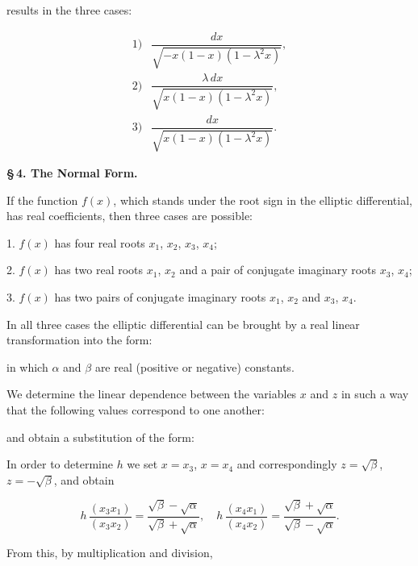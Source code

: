 
results in the three cases:

\[
\begin{array}{ll}
1) & \dfrac{dx}{\sqrt{-x(1-x)(1-\lambda^2x)}}, \\[10pt]
2) & \dfrac{\lambda\,dx}{\sqrt{x(1-x)(1-\lambda^2x)}}, \\[10pt]
3) & \dfrac{dx}{\sqrt{x(1-x)(1-\lambda^2x)}}.
\end{array}
\]

\begin{center}
\textbf{\S\,4. The  Normal Form.}
\end{center}

If the function $f(x)$, which stands under the root sign in the elliptic differential, has real coefficients, then three cases are possible:

1. $f(x)$ has four real roots $x_1$, $x_2$, $x_3$, $x_4$;

2. $f(x)$ has two real roots $x_1$, $x_2$ and a pair of conjugate imaginary roots $x_3$, $x_4$;

3. $f(x)$ has two pairs of conjugate imaginary roots $x_1$, $x_2$ and $x_3$, $x_4$.

In all three cases the elliptic differential can be brought by a real linear transformation into the form:


in which $\alpha$ and $\beta$ are real (positive or negative) constants.

We determine the linear dependence between the variables $x$ and $z$ in such a way that the following values correspond to one another:


and obtain a substitution of the form:


In order to determine $h$ we set $x = x_3$, $x = x_4$ and correspondingly $z = \sqrt{\beta}$, $z = -\sqrt{\beta}$, and obtain

\[
h\,\dfrac{(x_3x_1)}{(x_3x_2)} = \dfrac{\sqrt{\beta}-\sqrt{\alpha}}{\sqrt{\beta}+\sqrt{\alpha}}, \quad h\,\dfrac{(x_4x_1)}{(x_4x_2)} = \dfrac{\sqrt{\beta}+\sqrt{\alpha}}{\sqrt{\beta}-\sqrt{\alpha}}.
\]

From this, by multiplication and division,

